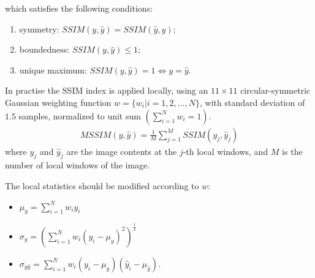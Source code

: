 which satisfies the following conditions:
\begin{enumerate}
\item symmetry: $SSIM(y, \hat{y}) = SSIM(\hat{y}, y)$;
\item boundedness: $SSIM(y, \hat{y}) \leq 1$;
\item unique maximum: $SSIM(y, \hat{y}) = 1 \iff y = \hat{y}$.
\end{enumerate}

In practise the SSIM index is applied locally, using an $11\times11$ circular-symmetric Gaussian weighting function $w = \{w_i | i = 1, 2, \dots, N\}$, with standard deviation of $1.5$ samples, normalized to unit sum $\left( \sum^{N}_{i=1} w_i = 1 \right)$.
\begin{align}
    MSSIM(y, \hat{y}) =  \frac{1}{M} \sum^{M}_{j=1} SSIM(y_j, \hat{y}_j)
\end{align}
where $y_j$ and $\hat{y}_j$ are the image contents at the $j$-th local windows, and $M$ is the number of local windows of the image.

The local statistics should be modified according to $w$:
\begin{itemize}
\item $ \mu_{y} = \sum^{N}_{i = 1} w_i y_i $
\item $ \sigma_{y} = \left( \sum^{N}_{i = 1} w_i (y_i - \mu_y)^2 \right) ^ {\frac{1}{2}} $
\item $ \sigma_{y \hat{y}} = \sum^{N}_{i = 1} w_i (y_i - \mu_y) (\hat{y}_i - \mu_{\hat{y}}) $.
\end{itemize}
